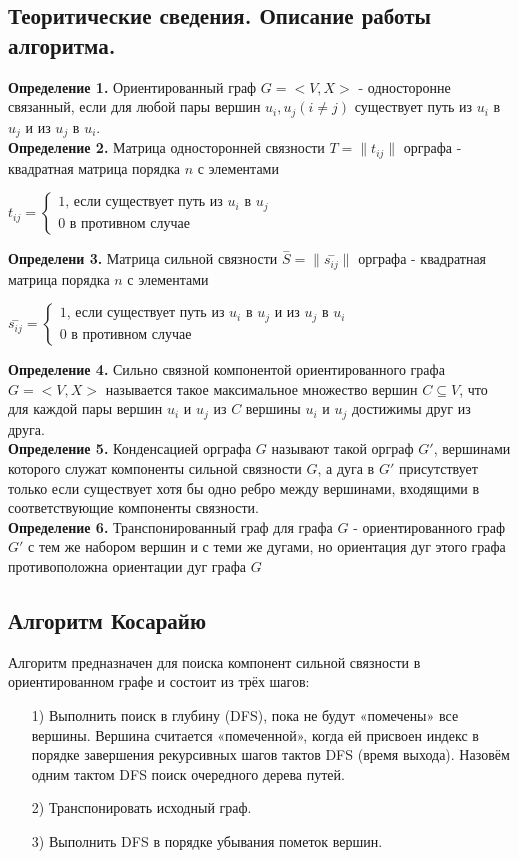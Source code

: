 \subsection{Теоритические сведения. Описание работы алгоритма.}
\noindent\textbf{Определение 1.} Ориентированный граф $G = <V,X>$ - односторонне связанный, если для любой пары вершин $u_i, u_j (i \neq j)$ существует путь из $u_i$ в $u_j$ и из $u_j$ в $u_i$. \\
\textbf{Определение 2.} Матрица односторонней связности $T = \|t_{ij}\|$ орграфа - квадратная матрица порядка $n$ с элементами
\begin{center}
    $t_{ij} = \begin{cases}
    \text{1, если существует путь из $u_i$ в $u_j$}\\
    \text{0 в противном случае}
    \end{cases}$
\end{center}
\textbf{Определени 3.} Матрица сильной связности $\overset{-}{S} = \|\overset{-}{s_{ij}}\|$ орграфа - квадратная матрица порядка $n$ с элементами
\begin{center}
    $\overset{-}{s_{ij}} = \begin{cases}
    \text{1, если существует путь из $u_i$ в $u_j$ и из $u_j$ в $u_i$}\\
    \text{0 в противном случае}
    \end{cases}$
\end{center}
\textbf{Определение 4.} Сильно связной компонентой ориентированного графа $G = <V,X>$ называется такое максимальное множество вершин $C\subseteq V$, что для каждой пары вершин $u_i$ и $u_j$ из $C$ вершины $u_i$ и $u_j$ достижимы друг из друга.\\
\textbf{Определение 5.} Конденсацией орграфа $G$ называют такой орграф $G'$, вершинами которого служат компоненты сильной связности $G$, а дуга в $G'$ присутствует только если существует хотя бы одно ребро между вершинами, входящими в соответствующие компоненты связности.\\
\textbf{Определение 6.} Транспонированный граф для графа $G$ - ориентированного граф $G'$ с тем же набором вершин и с теми же дугами, но ориентация дуг этого графа противоположна ориентации дуг графа $G$
\newpage
\subsection{Алгоритм Косарайю}
Алгоритм предназначен для поиска компонент сильной связности в ориентированном графе и состоит из трёх шагов:
\begin{enumerate}
    \item [1)] Выполнить поиск в глубину (DFS), пока не будут «помечены» все вершины. Вершина считается «помеченной», когда ей присвоен индекс в порядке завершения рекурсивных шагов тактов DFS  (время выхода). Назовём одним тактом DFS поиск очередного дерева путей.
    \item [2)] Транспонировать исходный граф.
    \item [3)] Выполнить DFS в порядке убывания пометок вершин.
\end{enumerate}



